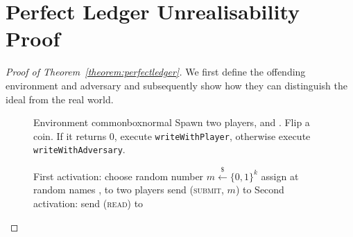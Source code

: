\section{Perfect Ledger Unrealisability Proof}
\label{sec:perfect-ledger:proof}
  \begin{proof}[Proof of Theorem~\ref{theorem:perfectledger}]
    We first define the offending environment and adversary and subsequently
    show how they can distinguish the ideal from the real world.
    \begin{figure}[H]
      \begin{titlebox}{Environment \normalfont \perfectenv}{commonbox}{normal}
        Spawn two players, \alice{} and \bob. Flip a coin. If it returns 0,
        execute \texttt{writeWithPlayer}, otherwise execute
        \texttt{writeWithAdversary}.
        \begin{algorithmic}[1]
            \State First activation:
            \Indent
              \State choose random number $m \overset{\$}{\gets} \{0, 1\}^k$
              \State assign at random names \alice, \bob{} to two players
              \State send (\textsc{submit}, $m$) to \alice
            \EndIndent
            \State Second activation:
            \Indent
              \State send (\textsc{read}) to \bob
                \State {} 
                \label{fig:perfectledger:env:coin0:real}
                \State {} 
                \label{fig:perfectledger:env:coin0:comm}
                \State {} 
                \label{fig:perfectledger:env:coin0:nocomm}
              \EndIf
            \EndIndent
          \EndProcedure
          \Statex


\end{algorithmic}
\end{titlebox}
\end{figure}
\end{proof}
